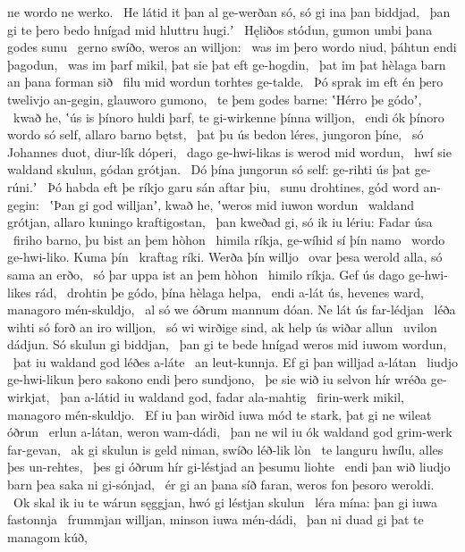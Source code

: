 ne wordo ne werko. \hld\ He látid it þan al ge-werðan só,
só gi ina þan biddjad, \hld\ þan gi te þero bedo hnígad
mid hluttru hugi.ʼ \hld\ Hęliðos stódun,
gumon umbi þana godes sunu \hld\ gerno swíðo,
weros an willjon: \hld\ was im þero wordo niud,
þáhtun endi þagodun, \hld\ was im þarf mikil,
þat sie þat eft ge-hogdin, \hld\ þat im þat hèlaga barn
an þana forman sið \hld\ filu mid wordun
torhtes ge-talde. \hld\ Þó sprak im eft én þero twelivjo an-gegin,
glauworo gumono, \hld\ te þem godes barne:
ʽHérro þe gódoʼ, \hld\ kwað he, ʽús is þínoro huldi þarf,
te gi-wirkenne þínna willjon, \hld\ endi ók þínoro wordo só self,
allaro barno bętst, \hld\ þat þu ús bedon léres,
jungoron þíne, \hld\ só Johannes duot,
diur-lík dóperi, \hld\ dago ge-hwi-likas
is werod mid wordun, \hld\ hwí sie waldand skulun,
gódan grótjan. \hld\ Dó þína jungorun só self:
ge-rihti ús þat ge-rúni.ʼ \hld\ Þó habda eft þe ríkjo garu
sán aftar þiu, \hld\ sunu drohtines,
gód word an-gegin: \hld\ ʽÞan gi god willjanʼ, kwað he,
ʽweros mid iuwon wordun \hld\ waldand grótjan,
allaro kuningo kraftigostan, \hld\ þan kweðad gi, só ik iu lériu:
Fadar úsa \hld\ firiho barno,
þu bist an þem hòhon \hld\ himila ríkja,
ge-wíhid sí þín namo \hld\ wordo ge-hwi-liko.
Kuma þín \hld\ kraftag ríki.
Werða þín willjo \hld\ ovar þesa werold alla,
só sama an erðo, \hld\ só þar uppa ist
an þem hòhon \hld\ himilo ríkja.
Gef ús dago ge-hwi-likes rád, \hld\ drohtin þe gódo,
þína hèlaga helpa, \hld\ endi a-lát ús, hevenes ward,
managoro mén-skuldjo, \hld\ al só we óðrum mannum dóan.
Ne lát ús far-lédjan \hld\ léða wihti
só forð an iro willjon, \hld\ só wi wirðige sind,
ak help ús wiðar allun \hld\ uvilon dádjun.
Só skulun gi biddjan, \hld\ þan gi te bede hnígad
weros mid iuwom wordun, \hld\ þat iu waldand god
léðes a-láte \hld\ an leut-kunnja.
Ef gi þan willjad a-látan \hld\ liudjo ge-hwi-likun
þero sakono endi þero sundjono, \hld\ þe sie wið iu selvon hír
wréða ge-wirkjat, \hld\ þan a-látid iu waldand god,
fadar ala-mahtig \hld\ firin-werk mikil,
managoro mén-skuldjo. \hld\ Ef iu þan wirðid iuwa mód te stark,
þat gi ne wileat óðrun \hld\ erlun a-látan,
weron wam-dádi, \hld\ þan ne wil iu ók waldand god
grim-werk far-gevan, \hld\ ak gi skulun is geld niman,
swíðo léð-lik lòn \hld\ te languru hwílu,
alles þes un-rehtes, \hld\ þes gi óðrum hír
gi-léstjad an þesumu liohte \hld\ endi þan wið liudjo barn
þea saka ni gi-sónjad, \hld\ ér gi an þana síð faran,
weros fon þesoro weroldi. \hld\ Ok skal ik iu te wárun sęggjan,
hwó gi léstjan skulun \hld\ léra mína:
þan gi iuwa fastonnja \hld\ frummjan willjan,
minson iuwa mén-dádi, \hld\ þan ni duad gi þat te managom kúð,
